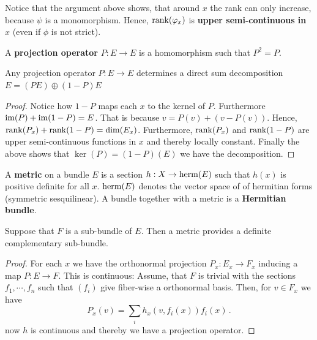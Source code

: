 \begin{corollary}\label{cor: rank is upper-semi-continuous}
	Notice that the argument above shows, that around $x$ the rank can only increase, because $\psi$ is a monomorphism. Hence, $\operatorname{\mathrm{rank}}(\varphi_x)$ is \textbf{upper semi-continuous in} $x$ (even if $\phi$ is not strict).
\end{corollary}
\begin{definition}\label{def: Projection operator}
	A \textbf{projection operator} $P: E\to E$ is a homomorphism such that $P^2=P$. 
\end{definition}
\begin{lemma}\label{lem: projections determin direct sum compositions}
	Any projection operator $P:E\to E$ determines a direct sum decomposition $E=(PE)\oplus (1-P)E$
\end{lemma}
\begin{proof}
	Notice how $1-P$ maps each $x$ to the kernel of $P$. Furthermore $\mathrm{im}(P)+\mathrm{im}(1-P)=E$. 
	That is because $v=P(v)+(v-P(v))$. Hence, $\operatorname{\mathrm{rank}}(P_x)+\operatorname{\mathrm{rank}}(1-P)=\dim(E_x)$. Furthermore, $\operatorname{\mathrm{rank}}(P_x)$ and $\operatorname{\mathrm{rank}}(1-P)$ are upper semi-continuous functions in $x$ and thereby locally constant. Finally the above shows that $\ker(P)=(1-P)(E)$ we have the decomposition.
\end{proof}
\begin{definition}\label{def: Metrics on Bundles}
	A \textbf{metric} on a bundle $E$ is a section $h:X\to \operatorname{\mathrm{herm}}(E)$ such that $h(x)$ is positive definite for all $x$. $\operatorname{\mathrm{herm}}(E)$ denotes the vector space of of hermitian forms (symmetric sesquilinear). A bundle together with a metric is a \textbf{Hermitian bundle}.
\end{definition}
\begin{lemma}\label{lem: Metric induced complement}
	Suppose that $F$ is a sub-bundle of $E$. Then a metric provides a definite complementary sub-bundle.
\end{lemma}
\begin{proof}
	For each $x$ we have the orthonormal projection $P_x:E_x\to F_x$ inducing a map $P:E \to F$. This is continuous: 
	Assume, that $F$ is trivial with the sections $f_1, \cdots ,f_n$ such that $(f_i)$ give fiber-wise a orthonormal basis. Then, for $v\in F_x$ we have 
	\begin{equation*}
		P_x(v)=\sum_i h_x(v,f_i(x))f_i(x)\,.
	\end{equation*}
	now $h$ is continuous and thereby we have a projection operator. 
\end{proof}
